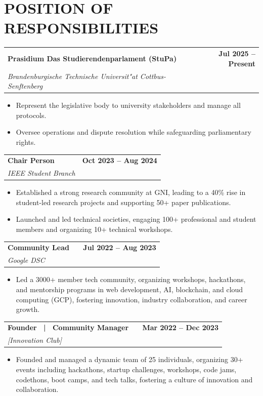 \documentclass[a4paper,11pt]{article}
\makeatletter
\newcommand{\entryheader}[4]{%
  \begin{tabularx}{\textwidth}{@{}>{\RaggedRight\arraybackslash}X r@{}}
    \textbf{#1} & \textbf{#2} \\
    \textit{#3} & \textit{#4} \\
  \end{tabularx}%
}
\newenvironment{entrybullets}{%
  \begin{minipage}[t]{0.77\textwidth}
    \begin{itemize}[leftmargin=*,label=\textbullet,align=left]
}{%
    \end{itemize}
  \end{minipage}
}
\newcommand{\extlink}{\raisebox{0.2ex}{\scriptsize\faExternalLink*}}
\makeatother
\begin{document}
\section*{POSITION OF RESPONSIBILITIES}
\entryheader{Prasidium Das Studierendenparlament (StuPa)}{Jul 2025 -- Present}{Brandenburgische Technische Universit"at Cottbus-Senftenberg}{}
\begin{entrybullets}
  \item Represent the legislative body to university stakeholders and manage all protocols.
  \item Oversee operations and dispute resolution while safeguarding parliamentary rights.
\end{entrybullets}

\vspace{0.25cm}
\entryheader{Chair Person}{Oct 2023 -- Aug 2024}{IEEE Student Branch}{}
\begin{entrybullets}
  \item Established a strong research community at GNI, leading to a 40\% rise in student-led research projects and supporting 50+ paper publications.
  \item Launched and led technical societies, engaging 100+ professional and student members and organizing 10+ technical workshops.
\end{entrybullets}

\vspace{0.25cm}
\newpage
\thispagestyle{secondpage}

\entryheader{Community Lead \ \extlink}{Jul 2022 -- Aug 2023}{Google DSC}{}
\begin{entrybullets}
  \item Led a 3000+ member tech community, organizing workshops, hackathons, and mentorship programs in web development, AI, blockchain, and cloud computing (GCP), fostering innovation, industry collaboration, and career growth.
\end{entrybullets}

\vspace{0.25cm}
\entryheader{Founder \ | \ Community Manager \ \extlink}{Mar 2022 -- Dec 2023}{[Innovation Club]}{}
\begin{entrybullets}
  \item Founded and managed a dynamic team of 25 individuals, organizing 30+ events including hackathons, startup challenges, workshops, code jams, codethons, boot camps, and tech talks, fostering a culture of innovation and collaboration.
\end{entrybullets}
\end{document}
